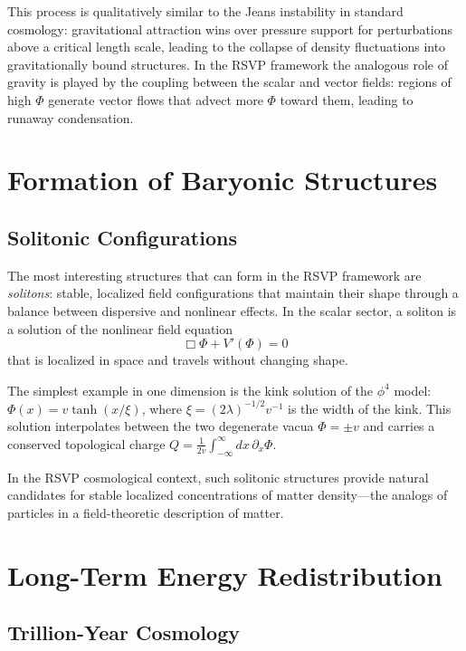 \documentclass[12pt,a4paper,oneside]{book}
\theoremstyle{definition}
\theoremstyle{plain}
\theoremstyle{remark}
\begin{document}
This process is qualitatively similar to the Jeans instability in standard
cosmology: gravitational attraction wins over pressure support for perturbations
above a critical length scale, leading to the collapse of density fluctuations
into gravitationally bound structures. In the RSVP framework the analogous
role of gravity is played by the coupling between the scalar and vector fields:
regions of high $\Phi$ generate vector flows that advect more $\Phi$ toward
them, leading to runaway condensation.

\chapter{Formation of Baryonic Structures}

\section{Solitonic Configurations}

The most interesting structures that can form in the RSVP framework are
\emph{solitons}: stable, localized field configurations that maintain their
shape through a balance between dispersive and nonlinear effects. In the
scalar sector, a soliton is a solution of the nonlinear field equation
\begin{equation}
\Box\Phi + V'(\Phi) = 0
\end{equation}
that is localized in space and travels without changing shape.

The simplest example in one dimension is the kink solution of the
$\phi^4$ model: $\Phi(x) = v\tanh(x/\xi)$, where $\xi = (2\lambda)^{-1/2}v^{-1}$
is the width of the kink. This solution interpolates between the two
degenerate vacua $\Phi = \pm v$ and carries a conserved topological charge
$Q = \frac{1}{2v}\int_{-\infty}^\infty dx\,\partial_x\Phi$.

In the RSVP cosmological context, such solitonic structures provide natural
candidates for stable localized concentrations of matter density---the
analogs of particles in a field-theoretic description of matter.

\chapter{Long-Term Energy Redistribution}

\section{Trillion-Year Cosmology}
\end{document}
